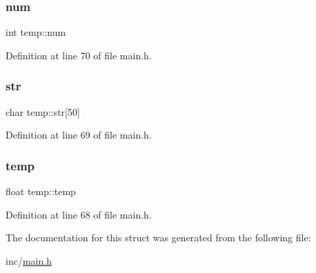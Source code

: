 \subsubsection{\texorpdfstring{num}{num}}
{\footnotesize\ttfamily int temp\+::num}



Definition at line 70 of file main.\+h.

\mbox{\label{structtemp_af9b2099e55b58c3aabcde6e7dd077dae}} 
\subsubsection{\texorpdfstring{str}{str}}
{\footnotesize\ttfamily char temp\+::str\mbox{[}50\mbox{]}}



Definition at line 69 of file main.\+h.

\mbox{\label{structtemp_ab73df077c620529b5de4a6bdaf187113}} 
\subsubsection{\texorpdfstring{temp}{temp}}
{\footnotesize\ttfamily float temp\+::temp}



Definition at line 68 of file main.\+h.



The documentation for this struct was generated from the following file\+:\begin{DoxyCompactItemize}
\item 
inc/\hyperlink{main_8h}{main.\+h}\end{DoxyCompactItemize}
